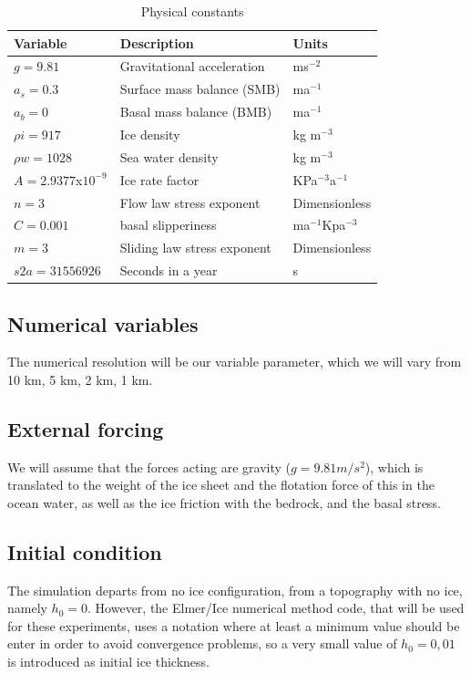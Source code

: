 \documentclass{article}
\begin{document}
\begin{table}[!h]
	\begin{center}
		\caption{Physical constants}
		\label{Physical constants}
		\begin{tabular}{|l|l|l|}
			\hline
			Variable          & Description                 & Units           \\ \hline
			$g=9.81$         & Gravitational acceleration  & ms$^{-2}$         \\ \hline
			$a_s=0.3$       & Surface mass balance (SMB)  & ma$^{-1}$         \\ \hline
			$a_b=0$             & Basal mass balance (BMB)    &   ma$^{-1}$         \\ \hline
			$\rho i=917$        & Ice density                 & kg m$^{-3}$       \\ \hline
			$\rho w=1028$      & Sea water density           & kg m$^{-3}$       \\ \hline
			$A= 2.9377$x$10^{-9}$ & Ice rate factor             & KPa$^{-3}$a$^{-1}$  \\ \hline
			$n=3$               & Flow law stress exponent    &  Dimensionless               \\ \hline
			$C=0.001$           & basal slipperiness          & ma$^{-1}$Kpa$^{-3}$ \\ \hline
			$m=3$               & Sliding law stress exponent &   Dimensionless              \\ \hline
			$s2a=31556926$     & Seconds in a year           & s         \\ \hline
		\end{tabular}
	\end{center}
\end{table}

\subsection{Numerical variables}
The numerical resolution will be our variable parameter, which we will vary from 10 km, 5 km, 2 km, 1 km.
\subsection{External forcing}
We will assume that the forces acting are gravity ($g=9.81 m/s^2$), which is translated to the weight of the ice sheet and the flotation force of this in the ocean water, as well as the ice friction with the bedrock, and the basal stress.
\subsection{Initial condition}
The simulation departs from no ice configuration, from a topography with no ice, namely $h_0 = 0$. However, the Elmer/Ice numerical method code, that will be used for these experiments, uses a notation where at least a minimum value should be enter in order to avoid convergence problems, so a very small value of $h_0 = 0,01$ is introduced as initial ice thickness. 
\end{document}
